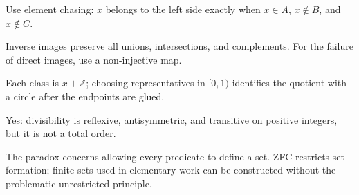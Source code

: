 \begin{selectedhints}
    \item Use element chasing: $x$ belongs to the left side exactly when $x\in A$, $x\notin B$, and $x\notin C$.
    \item Inverse images preserve all unions, intersections, and complements. For the failure of direct images, use a non-injective map.
    \item Each class is $x+\mathbb{Z}$; choosing representatives in $[0,1)$ identifies the quotient with a circle after the endpoints are glued.
    \item Yes: divisibility is reflexive, antisymmetric, and transitive on positive integers, but it is not a total order.
    \item The paradox concerns allowing every predicate to define a set. ZFC restricts set formation; finite sets used in elementary work can be constructed without the problematic unrestricted principle.
\end{selectedhints}
